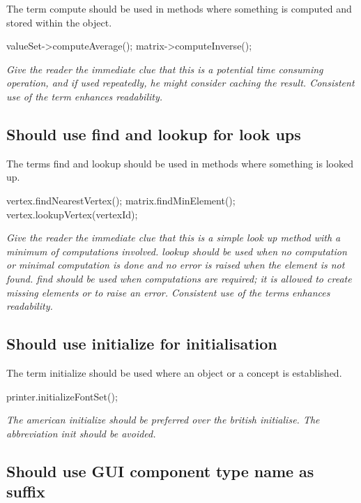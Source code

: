 \documentclass[a4paper,11pt,oneside]{scrbook}
\newcommand{\guideline}[1]{{\subsection{#1}}}
\newcommand{\motivation}[1]{{\normalfont \itshape #1}}
\newcommand{\trcode}[1]{{\normalfont \ttfamily #1}}
\begin{document}
The term \trcode{compute} should be used in methods where something is computed
and stored within the object.

\begin{code}
  valueSet->computeAverage();
  matrix->computeInverse(); 
\end{code}

\motivation{ 
  Give the reader the immediate clue that this is a potential time consuming
  operation, and if used repeatedly, he might consider caching the
  result. Consistent use of the term enhances readability.
}

\guideline{Should use \trcode{find} and \trcode{lookup} for look ups}

The terms \trcode{find} and \trcode{lookup} should be used in methods where
something is looked up.

\begin{code}
  vertex.findNearestVertex();
  matrix.findMinElement();
  vertex.lookupVertex(vertexId);
\end{code}

\motivation{
  Give the reader the immediate clue that this is a simple look up method with a
  minimum of computations involved. \trcode{lookup} should be used when no
  computation or minimal computation is done and no error is raised when the
  element is not found. \trcode{find} should be used when computations are
  required; it is allowed to create missing elements or to raise an
  error. Consistent use of the terms enhances readability.
}

\guideline{Should use \trcode{initialize} for initialisation}

The term \trcode{initialize} should be used where an object or a concept is
established.

\begin{code}
  printer.initializeFontSet(); 
\end{code}

\motivation{
  The american initialize should be preferred over the british initialise.  The
  abbreviation \trcode{init} should be avoided.
}

\guideline{Should use GUI component type name as suffix}
\end{document}
